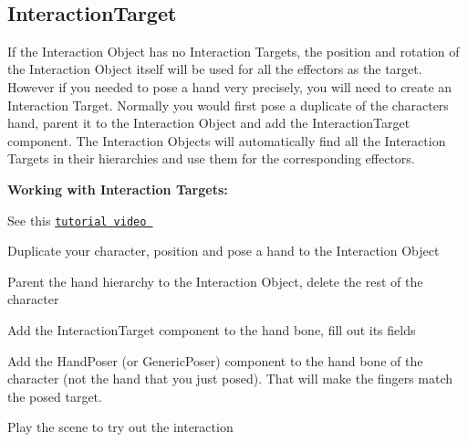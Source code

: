~\newline
 \hypertarget{page10_interactionTarget}{}\subsection{Interaction\+Target}\label{page10_interactionTarget}
If the Interaction Object has no Interaction Targets, the position and rotation of the Interaction Object itself will be used for all the effectors as the target. However if you needed to pose a hand very precisely, you will need to create an Interaction Target. Normally you would first pose a duplicate of the character\textquotesingle{}s hand, parent it to the Interaction Object and add the Interaction\+Target component. The Interaction Objects will automatically find all the Interaction Targets in their hierarchies and use them for the corresponding effectors.



{\bfseries Working with Interaction Targets\+:}
\begin{DoxyItemize}
\item See this \href{https://www.youtube.com/watch?v=sVWdCNEnxAE}{\tt tutorial video }
\item Duplicate your character, position and pose a hand to the Interaction Object
\item Parent the hand hierarchy to the Interaction Object, delete the rest of the character
\item Add the Interaction\+Target component to the hand bone, fill out it\textquotesingle{}s fields
\item Add the Hand\+Poser (or Generic\+Poser) component to the hand bone of the character (not the hand that you just posed). That will make the fingers match the posed target.
\item Play the scene to try out the interaction
\end{DoxyItemize}

